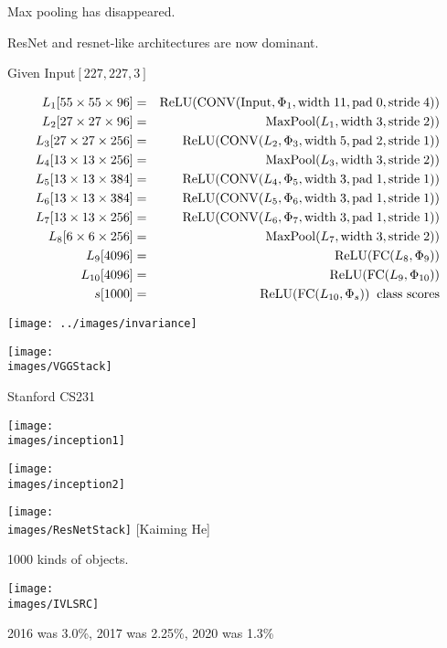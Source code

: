 {\vfill
Max pooling has disappeared.

\vfill
ResNet and resnet-like architectures are now dominant.

{\huge
\centerline{Given Input$[227,227,3]$}

\begin{eqnarray*}
L_1[55 \times 55 \times 96] & = & \mathrm{ReLU}(\mathrm{CONV}(\mathrm{Input},\Phi_1,\mathrm{width}\;11,\mathrm{pad}\;0,\mathrm{stride}\;4)) \\
L_2[27 \times 27 \times 96] & = & \mathrm{MaxPool}(L_1,\mathrm{width}\;3,\mathrm{stride}\;2))  \\
L_3[27 \times 27 \times 256] & = & \mathrm{ReLU}(\mathrm{CONV}(L_2,\Phi_3,\mathrm{width}\;5,\mathrm{pad}\;2,\mathrm{stride}\;1))  \\
L_4[13 \times 13 \times 256] & = & \mathrm{MaxPool}(L_3,\mathrm{width}\;3,\mathrm{stride}\;2))  \\
L_5[13 \times 13 \times 384] & = & \mathrm{ReLU}(\mathrm{CONV}(L_4,\Phi_5,\mathrm{width}\;3,\mathrm{pad}\;1,\mathrm{stride}\;1))  \\
L_6[13 \times 13 \times 384] & = & \mathrm{ReLU}(\mathrm{CONV}(L_5,\Phi_6,\mathrm{width}\;3,\mathrm{pad}\;1,\mathrm{stride}\;1))  \\
L_7[13 \times 13 \times 256] & = & \mathrm{ReLU}(\mathrm{CONV}(L_6,\Phi_7,\mathrm{width}\;3,\mathrm{pad}\;1,\mathrm{stride}\;1))  \\
L_8[6 \times 6 \times 256] & = & \mathrm{MaxPool}(L_7,\mathrm{width}\;3,\mathrm{stride}\;2)) \\
L_9[4096] & = & \mathrm{ReLU}(\mathrm{FC}(L_8,\Phi_9)) \\
L_{10}[4096] & = & \mathrm{ReLU}(\mathrm{FC}(L_9,\Phi_{10})) \\
s[1000] & = & \mathrm{ReLU}(\mathrm{FC}(L_{10},\Phi_s)) \;\;\mbox{class scores}
\end{eqnarray*}
}


\vfill
\centerline{\texttt{[image: ../images/invariance]}}


\centerline{\texttt{[image: \\images/VGGStack]}}
\centerline{\large Stanford CS231}


\centerline{\texttt{[image: \\images/inception1]}}
\vfill
\centerline{\texttt{[image: \\images/inception2]}}

\centerline{\texttt{[image: \\images/ResNetStack]} {\large [Kaiming He]}}


1000 kinds of objects.

\vfill
\centerline{\texttt{[image: \\images/IVLSRC]}}
2016 was 3.0\%, 2017 was  2.25\%, 2020 was 1.3\%
 
}

